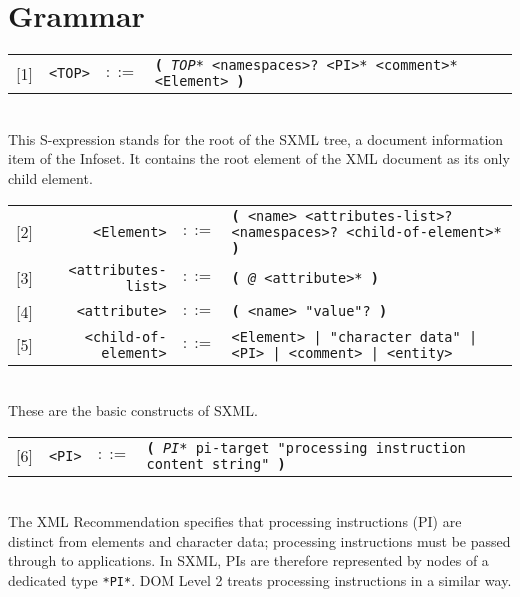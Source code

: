 \documentclass[10pt]{article}
\begin{document}
\section{Grammar}
\begin{tabular}{rrcp{2.8in}}
{[}1{]} & \texttt{<TOP>} &  $::=$ & \texttt{\textbf{(} {\itshape *TOP*} <namespaces>? <PI>* <comment>* <Element> \textbf{)} } \\
\end{tabular}
\\
This S-expression stands for the root of the SXML tree, a
document information item of the Infoset. It contains the root element
of the XML document as its only child element.

\begin{tabular}{rrcp{2.8in}}
{[}2{]} & \texttt{<Element>} &  $::=$ & \texttt{\textbf{(} <name> <attributes-list>? <namespaces>? <child-of-element>* \textbf{)} } \\
{[}3{]} & \texttt{<attributes-list>} &  $::=$ & \texttt{\textbf{(} {\itshape @} <attribute>* \textbf{)} } \\
{[}4{]} & \texttt{<attribute>} &  $::=$ & \texttt{\textbf{(} <name> "value"? \textbf{)} } \\
{[}5{]} & \texttt{<child-of-element>} &  $::=$ & \texttt{<Element> | "character data" | <PI> | <comment> | <entity> } \\
\end{tabular}
\\
These are the basic constructs of SXML.

\begin{tabular}{rrcp{2.8in}}
{[}6{]} & \texttt{<PI>} &  $::=$ & \texttt{\textbf{(} {\itshape *PI*} pi-target "processing instruction content string" \textbf{)} } \\
\end{tabular}
\\
The XML Recommendation specifies that processing instructions (PI) are distinct from elements and character data; processing
instructions must be passed through to applications. In SXML, PIs are
therefore represented by nodes of a dedicated type \texttt{*PI*}. DOM Level 2 treats processing instructions in a similar way.
\end{document}
